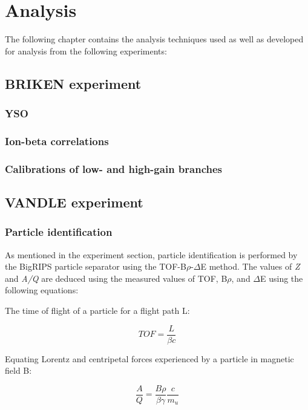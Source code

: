 \chapter{Analysis} \label{ch:analysis}

The following chapter contains the analysis techniques used  as well as developed for analysis from the following experiments:



\section{BRIKEN experiment}

\subsection{YSO }
\subsection{Ion-beta correlations}
\subsection{Calibrations of low- and high-gain branches}


\section{VANDLE experiment}
\subsection{Particle identification}

As mentioned in the experiment section, particle identification is performed by the BigRIPS particle separator using the TOF-B$\rho$-$\Delta$E method. The values of \textit{Z} and \textit{A/Q} are deduced using the measured values of TOF, B$\rho$, and $\Delta$E using the following equations:

The time of flight of a particle for a flight path L:

\begin{equation}\label{eq:1}
TOF = \frac{L}{\beta c}
\end{equation}

Equating Lorentz and centripetal forces experienced by a particle in magnetic field B:

\begin{equation}\label{eq:2}
\frac{A}{Q} = \frac{B \rho}{\beta \gamma} \frac{c}{m_{u}}
\end{equation}


